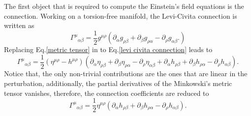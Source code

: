 \documentclass{article}
\begin{document}
The first object that is required to compute the Einstein's field equations is the
connection. Working on a torsion-free manifold, the Levi-Civita connection is written
as
\begin{equation}
    \label{levi civita connection}
    \Gamma^{\mu}{}_{\alpha\beta} = \frac{1}{2}g^{\mu\rho}\left(
        \partial_{\alpha}g_{\rho\beta} + \partial_{\beta}g_{\rho\alpha} -
        \partial_{\rho}g_{\alpha\beta}.
    \right)
\end{equation}
Replacing Eq.\eqref{metric tensor} in to Eq.\eqref{levi civita connection} leads to
\begin{equation}
    \Gamma^{\mu}{}_{\alpha\beta} = \frac{1}{2}\left(\eta^{\mu\rho} - h^{\mu\rho}\right)
        \left(\partial_{\alpha}\eta_{\rho\beta} 
        + \partial_{\beta}\eta_{\rho\alpha} 
        - \partial_{\rho}\eta_{\alpha\beta}
        + \partial_{\alpha}h_{\rho\beta} 
        + \partial_{\beta}h_{\rho\alpha} 
        - \partial_{\rho}h_{\alpha\beta}\right).
\end{equation}
Notice that, the only non-trivial contributions are the ones that are linear in the
perturbation, additionally, the partial derivatives of the Minkowski's metric tensor vanishes,
therefore, the connection coefficients are reduced to
\begin{equation}
    \label{levi civita connection flat + perturbation}
    \Gamma^{\mu}{}_{\alpha\beta} = \frac{1}{2}\eta^{\mu\rho}
        \left(\partial_{\alpha}h_{\rho\beta} + \partial_{\beta}h_{\rho\alpha} 
        - \partial_{\rho}h_{\alpha\beta}\right).
\end{equation}
\end{document}
